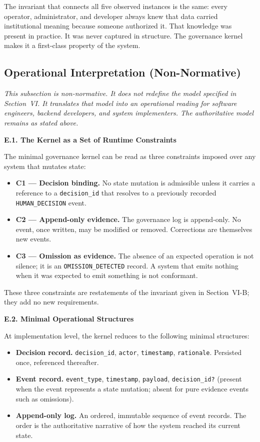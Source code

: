 \documentclass[conference]{IEEEtran}
\begin{document}
The invariant that connects all five observed instances is the same: every operator, administrator, and developer always knew that data carried institutional meaning because someone authorized it. That knowledge was present in practice. It was never captured in structure. The governance kernel makes it a first-class property of the system.

\subsection{Operational Interpretation (Non-Normative)}
\label{sec:opinterp}

\emph{This subsection is non-normative. It does not redefine the model specified in Section~VI. It translates that model into an operational reading for software engineers, backend developers, and system implementers. The authoritative model remains as stated above.}

\noindent\textbf{E.1. The Kernel as a Set of Runtime Constraints}

The minimal governance kernel can be read as three constraints imposed over any system that mutates state:

\begin{itemize}
  \item \textbf{C1 --- Decision binding.} No state mutation is admissible unless it carries a reference to a \texttt{decision\_id} that resolves to a previously recorded \texttt{HUMAN\_DECISION} event.
  \item \textbf{C2 --- Append-only evidence.} The governance log is append-only. No event, once written, may be modified or removed. Corrections are themselves new events.
  \item \textbf{C3 --- Omission as evidence.} The absence of an expected operation is not silence; it is an \texttt{OMISSION\_DETECTED} record. A system that emits nothing when it was expected to emit something is not conformant.
\end{itemize}

These three constraints are restatements of the invariant given in Section~VI-B; they add no new requirements.

\noindent\textbf{E.2. Minimal Operational Structures}

At implementation level, the kernel reduces to the following minimal structures:

\begin{itemize}
  \item \textbf{Decision record.} \texttt{decision\_id}, \texttt{actor}, \texttt{timestamp}, \texttt{rationale}. Persisted once, referenced thereafter.
  \item \textbf{Event record.} \texttt{event\_type}, \texttt{timestamp}, \texttt{payload}, \texttt{decision\_id?} (present when the event represents a state mutation; absent for pure evidence events such as omissions).
  \item \textbf{Append-only log.} An ordered, immutable sequence of event records. The order is the authoritative narrative of how the system reached its current state.
\end{itemize}
\end{document}
